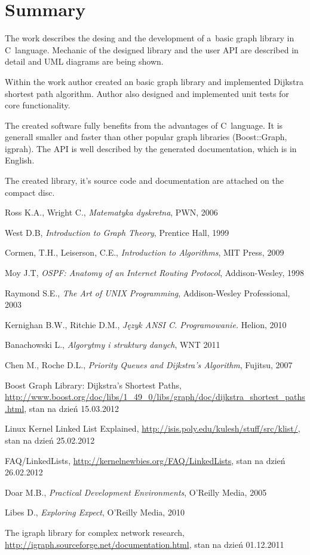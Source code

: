 \documentclass[a4paper,12pt,polish,twoside,openright]{thesis}
\begin{document}
\chapter*{Summary}
The work describes the desing and the development of a~basic graph library in C~language.
Mechanic of the designed library and the user API are described in detail and UML diagrams are being shown.

Within the work author created an basic graph library and implemented Dijkstra shortest path algorithm.
Author also designed and implemented unit tests for core functionality.

The created software fully benefits from the advantages of C~language.
It is generall smaller and faster than other popular graph libraries (Boost::Graph, igprah).
The API is well described by the generated documentation, which is in English.

The created library, it's source code and documentation are attached on the compact disc.

\begin{thebibliography}{19}
Ross K.A., Wright C., \emph{Matematyka dyskretna}, PWN, 2006

West D.B, \emph{Introduction to Graph Theory}, Prentice Hall, 1999

Cormen, T.H., Leiserson, C.E., \emph{Introduction to Algorithms}, MIT Press, 2009

Moy J.T, \emph{OSPF: Anatomy of an Internet Routing Protocol}, Addison-Wesley, 1998

Raymond S.E., \emph{The Art of UNIX Programming}, Addison-Wesley Professional, 2003

Kernighan B.W., Ritchie D.M., \emph{Język ANSI C. Programowanie.} Helion, 2010

Banachowski L., \emph{Algorytmy i struktury danych}, WNT 2011

Chen M., Roche D.L., \emph{Priority Queues and Dijkstra's Algorithm}, Fujitsu, 2007

Boost Graph Library: Dijkstra's Shortest Paths, \url{http://www.boost.org/doc/libs/1_49_0/libs/graph/doc/dijkstra_shortest_paths.html}, stan na dzień 15.03.2012

Linux Kernel Linked List Explained, \url{http://isis.poly.edu/kulesh/stuff/src/klist/}, stan na dzień 25.02.2012

FAQ/LinkedLists, \url{http://kernelnewbies.org/FAQ/LinkedLists}, stan na dzień 26.02.2012

Doar M.B., \emph{Practical Development Environments}, O'Reilly Media, 2005

Libes D., \emph{Exploring Expect}, O'Reilly Media, 2010

The igraph library for complex network research, \url{http://igraph.sourceforge.net/documentation.html}, stan na dzień 01.12.2011

\end{thebibliography}
\end{document}
